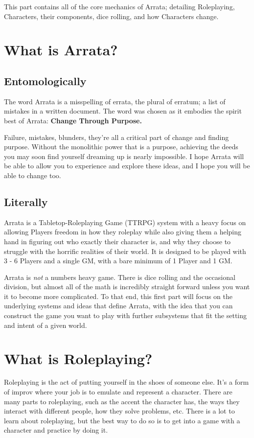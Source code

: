 \documentclass[../main.tex]{subfiles}
\begin{document}
    This part contains all of the core mechanics of Arrata; detailing Roleplaying, Characters, their components, dice rolling, and how Characters change.

    \section{What is Arrata?}

    \subsection{Entomologically}
    The word Arrata is a misspelling of errata, the plural of erratum; a list of mistakes in a written document. The word was chosen as it embodies the spirit best of Arrata: \textbf{Change Through Purpose.}

    Failure, mistakes, blunders, they're all a critical part of change and finding purpose. Without the monolithic power that is a purpose, achieving the deeds you may soon find yourself dreaming up is nearly impossible. I hope Arrata will be able to allow you to experience and explore these ideas, and I hope you will be able to change too.
    
    \subsection{Literally}
    Arrata is a Tabletop-Roleplaying Game (TTRPG) system with a heavy focus on allowing Players freedom in how they roleplay while also giving them a helping hand in figuring out who exactly their character is, and why they choose to struggle with the horrific realities of their world. It is designed to be played with 3 - 6 Players and a single GM, with a bare minimum of 1 Player and 1 GM.

    Arrata is {\em not} a numbers heavy game. There is dice rolling and the occasional division, but almost all of the math is incredibly straight forward unless you want it to become more complicated. To that end, this first part will focus on the underlying systems and ideas that define Arrata, with the idea that you can construct the game you want to play with further subsystems that fit the setting and intent of a given world.
    

    \section{What is Roleplaying?}

    Roleplaying is the act of putting yourself in the shoes of someone else. It's a form of improv where your job is to emulate and represent a character. There are many parts to roleplaying, such as the accent the character has, the ways they interact with different people, how they solve problems, etc. There is a lot to learn about roleplaying, but the best way to do so is to get into a game with a character and practice by doing it.
\end{document}

